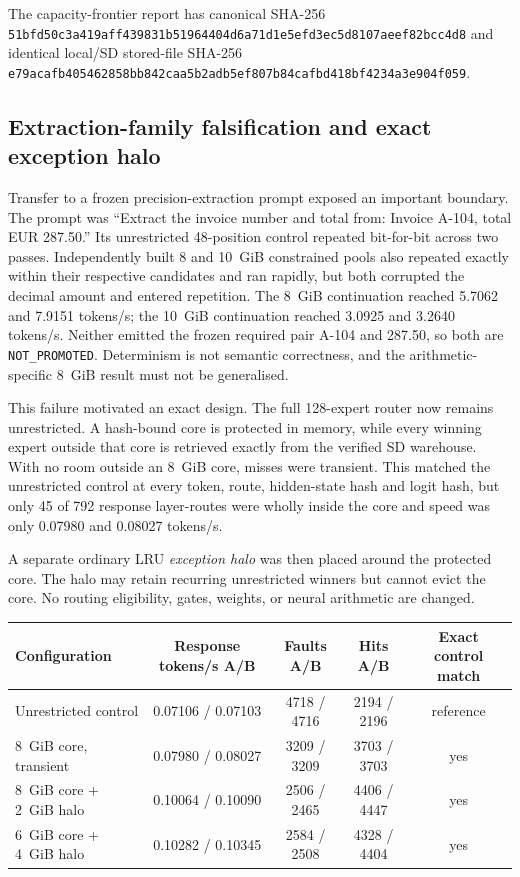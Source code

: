The capacity-frontier report has canonical SHA-256
\texttt{51bfd50c3a419aff439831b51964404d6a71d1e5efd3ec5d8107aeef82bcc4d8}
and identical local/SD stored-file SHA-256
\texttt{e79acafb405462858bb842caa5b2adb5ef807b84cafbd418bf4234a3e904f059}.

\subsection{Extraction-family falsification and exact exception halo}

Transfer to a frozen precision-extraction prompt exposed an important boundary.
The prompt was ``Extract the invoice number and total from: Invoice A-104,
total EUR 287.50.''  Its unrestricted 48-position control repeated bit-for-bit
across two passes.  Independently built 8 and 10~GiB constrained pools also
repeated exactly within their respective candidates and ran rapidly, but both
corrupted the decimal amount and entered repetition.  The 8~GiB continuation
reached 5.7062 and 7.9151 tokens/s; the 10~GiB continuation reached 3.0925 and
3.2640 tokens/s.  Neither emitted the frozen required pair A-104 and 287.50,
so both are \texttt{NOT\_PROMOTED}.  Determinism is not semantic correctness,
and the arithmetic-specific 8~GiB result must not be generalised.

This failure motivated an exact design.  The full 128-expert router now remains
unrestricted.  A hash-bound core is protected in memory, while every winning
expert outside that core is retrieved exactly from the verified SD warehouse.
With no room outside an 8~GiB core, misses were transient.  This matched the
unrestricted control at every token, route, hidden-state hash and logit hash,
but only 45 of 792 response layer-routes were wholly inside the core and speed
was only 0.07980 and 0.08027 tokens/s.

A separate ordinary LRU \emph{exception halo} was then placed around the
protected core.  The halo may retain recurring unrestricted winners but cannot
evict the core.  No routing eligibility, gates, weights, or neural arithmetic
are changed.

\begin{center}
\begin{tabular}{@{}lcccc@{}}
\toprule
Configuration & Response tokens/s A/B & Faults A/B & Hits A/B & Exact control match \\
\midrule
Unrestricted control & 0.07106 / 0.07103 & 4718 / 4716 & 2194 / 2196 & reference \\
8~GiB core, transient & 0.07980 / 0.08027 & 3209 / 3209 & 3703 / 3703 & yes \\
8~GiB core + 2~GiB halo & 0.10064 / 0.10090 & 2506 / 2465 & 4406 / 4447 & yes \\
6~GiB core + 4~GiB halo & 0.10282 / 0.10345 & 2584 / 2508 & 4328 / 4404 & yes \\
\bottomrule
\end{tabular}
\end{center}

